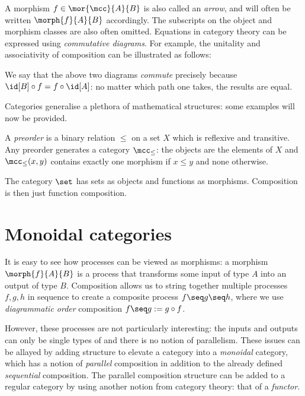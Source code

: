 A morphism \(f \in \mor{\mcc}{A}{B}\) is also called an \emph{arrow}, and will
often be written \(\morph{f}{A}{B}\) accordingly.
The subscripts on the object and morphism classes are also often omitted.
Equations in category theory can be expressed using \emph{commutative diagrams}.
For example, the unitality and associativity of composition can be illustrated
as follows:

\begin{center}
    
    \quad
    
\end{center}

We say that the above two diagrams \emph{commute} precisely because \(
    \id[B] \circ f = f \circ \id[A]
\): no matter which path one takes, the results are equal.

Categories generalise a plethora of mathematical structures: some examples will
now be provided.

\begin{example}[Preorder]
    A \emph{preorder} is a binary relation \(\leq\) on a set \(X\) which is
    reflexive and transitive.
    Any preorder generates a category \(\mcc_\leq\): the objects are the
    elements of \(X\) and \(\mcc_\leq(x, y)\) contains exactly one morphism if
    \(x \leq y\) and none otherwise.
\end{example}

\begin{example}
    The category \(\set\) has sets as objects and functions as morphisms.
    Composition is then just function composition.
\end{example}

\section{Monoidal categories}

It is easy to see how processes can be viewed as morphisms: a morphism
\(\morph{f}{A}{B}\) is a process that transforms some input of type \(A\) into
an output of type \(B\).
Composition allows us to string together multiple processes \(f, g, h\) in
sequence to create a composite process \(f \seq g \seq h\), where we use
\emph{diagrammatic order} composition \(f \seq g := g \circ f\).

However, these processes are not particularly interesting: the inputs and
outputs can only be single types of and there is no notion of parallelism.
These issues can be allayed by adding structure to elevate a category into a
\emph{monoidal} category, which has a notion of \emph{parallel} composition in
addition to the already defined \emph{sequential} composition.
The parallel composition structure can be added to a regular category by using
another notion from category theory: that of a \emph{functor}.

